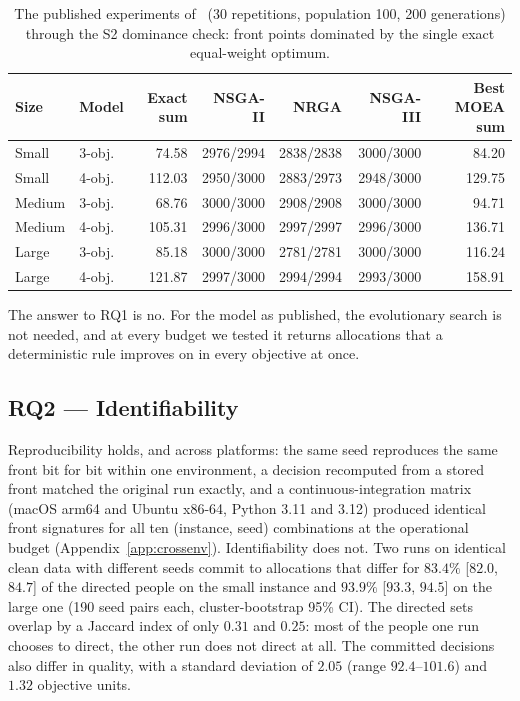 \documentclass[systems,article,submit,moreauthors,pdftex]{Definitions/mdpi}
\begin{document}
\begin{table}[H]
\centering
\caption{The published experiments of~\cite{rabiei2026resilient} (30 repetitions, population
100, 200 generations) through the S2 dominance check: front points dominated by the single
exact equal-weight optimum.\label{tab:paperA}}
\small
\begin{tabular}{llrrrrr}
\toprule
Size & Model & Exact sum & NSGA-II & NRGA & NSGA-III & Best MOEA sum\\
\midrule
Small & 3-obj. & 74.58 & 2976/2994 & 2838/2838 & 3000/3000 & 84.20\\
Small & 4-obj. & 112.03 & 2950/3000 & 2883/2973 & 2948/3000 & 129.75\\
Medium & 3-obj. & 68.76 & 3000/3000 & 2908/2908 & 3000/3000 & 94.71\\
Medium & 4-obj. & 105.31 & 2996/3000 & 2997/2997 & 2996/3000 & 136.71\\
Large & 3-obj. & 85.18 & 3000/3000 & 2781/2781 & 3000/3000 & 116.24\\
Large & 4-obj. & 121.87 & 2997/3000 & 2994/2994 & 2993/3000 & 158.91\\
\bottomrule
\end{tabular}
\end{table}

The answer to RQ1 is no. For the model as published, the evolutionary search is not needed,
and at every budget we tested it returns allocations that a deterministic rule improves on
in every objective at once.

\subsection{RQ2 --- Identifiability}\label{sec:rq2}
Reproducibility holds, and across platforms: the same seed reproduces the same front bit
for bit within one environment, a decision recomputed from a stored front matched the
original run exactly, and a continuous-integration matrix (macOS arm64 and Ubuntu x86-64,
Python 3.11 and 3.12) produced identical front signatures for all ten (instance, seed)
combinations at the operational budget (Appendix~\ref{app:crossenv}). Identifiability does not.
Two runs on identical clean data with different seeds commit to allocations that differ for
$83.4\%$ [$82.0$, $84.7$] of the directed people on the small instance and $93.9\%$ [$93.3$,
$94.5$] on the large one (190 seed pairs each, cluster-bootstrap 95\% CI). The directed sets
overlap by a Jaccard index of only $0.31$ and $0.25$: most of the people one run chooses to
direct, the other run does not direct at all. The committed decisions also differ in quality,
with a standard deviation of $2.05$ (range $92.4$--$101.6$) and $1.32$ objective units.
\end{document}
